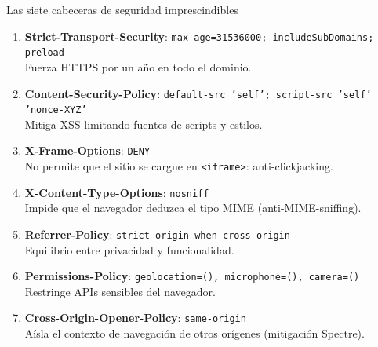 \documentclass[11pt,a4paper,openany]{book}
\begin{document}
\begin{cajabuenas}{Las siete cabeceras de seguridad imprescindibles}
\begin{enumerate}
\item \textbf{Strict-Transport-Security}:
\texttt{max-age=31536000; includeSubDomains; preload}\\
Fuerza HTTPS por un año en todo el dominio.

\item \textbf{Content-Security-Policy}:
\texttt{default-src 'self'; script-src 'self' 'nonce-XYZ'}\\
Mitiga XSS limitando fuentes de scripts y estilos.

\item \textbf{X-Frame-Options}: \texttt{DENY}\\
No permite que el sitio se cargue en \texttt{<iframe>}: anti-clickjacking.

\item \textbf{X-Content-Type-Options}: \texttt{nosniff}\\
Impide que el navegador deduzca el tipo MIME (anti-MIME-sniffing).

\item \textbf{Referrer-Policy}:
\texttt{strict-origin-when-cross-origin}\\
Equilibrio entre privacidad y funcionalidad.

\item \textbf{Permissions-Policy}:
\texttt{geolocation=(), microphone=(), camera=()}\\
Restringe APIs sensibles del navegador.

\item \textbf{Cross-Origin-Opener-Policy}: \texttt{same-origin}\\
Aísla el contexto de navegación de otros orígenes (mitigación
Spectre).
\end{enumerate}
\end{cajabuenas}
\end{document}
